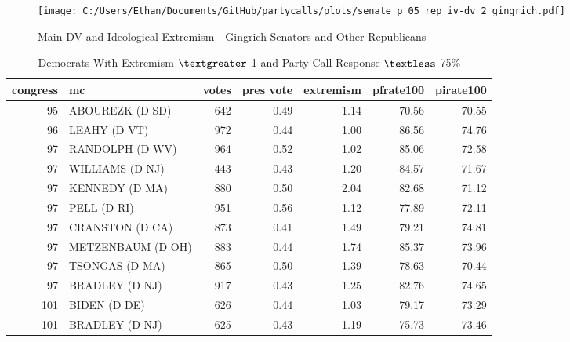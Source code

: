 \documentclass[12pt]{article}
\begin{document}
\begin{figure}[h]
	\caption{Main DV and Ideological Extremism - Gingrich Senators and Other Republicans}
	\texttt{[image: C:/Users/Ethan/Documents/GitHub/partycalls/plots/senate\_p\_05\_rep\_iv-dv\_2\_gingrich.pdf]}
 \end{figure}

\begin{table}[ht]
	\centering
		\caption{Democrats With Extremism $ \textgreater $ 1 and Party Call Response $ \textless $ 75\%}
	\begin{tabular}{rlrrrrr}
		\hline
		congress & mc & votes & pres vote & extremism & pfrate100 & pirate100 \\
		\hline
		95 & ABOUREZK (D SD) & 642 & 0.49 & 1.14 & 70.56 & 70.55 \\
		96 & LEAHY (D VT) & 972 & 0.44 & 1.00 & 86.56 & 74.76 \\
		97 & RANDOLPH (D WV) & 964 & 0.52 & 1.02 & 85.06 & 72.58 \\
		97 & WILLIAMS (D NJ) & 443 & 0.43 & 1.20 & 84.57 & 71.67 \\
		97 & KENNEDY (D MA) & 880 & 0.50 & 2.04 & 82.68 & 71.12 \\
		97 & PELL (D RI) & 951 & 0.56 & 1.12 & 77.89 & 72.11 \\
		97 & CRANSTON (D CA) & 873 & 0.41 & 1.49 & 79.21 & 74.81 \\
		97 & METZENBAUM (D OH) & 883 & 0.44 & 1.74 & 85.37 & 73.96 \\
		97 & TSONGAS (D MA) & 865 & 0.50 & 1.39 & 78.63 & 70.44 \\
		97 & BRADLEY (D NJ) & 917 & 0.43 & 1.25 & 82.76 & 74.65 \\
		101 & BIDEN (D DE) & 626 & 0.44 & 1.03 & 79.17 & 73.29 \\
		101 & BRADLEY (D NJ) & 625 & 0.43 & 1.19 & 75.73 & 73.46 \\
		\hline
	\end{tabular}
\end{table}
\end{document}
